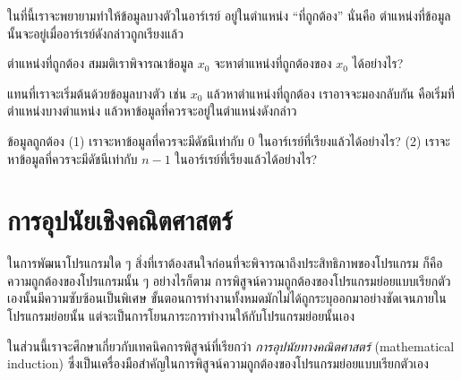 ใน{\wbr}ที่นี้{\wbr}เรา{\wbr}จะ{\wbr}พยายาม{\wbr}ทำ{\wbr}ให้{\wbr}ข้อมูล{\wbr}บาง{\wbr}ตัว{\wbr}ใน{\wbr}อาร์เรย์ อยู่{\wbr}ใน{\wbr}ตำแหน่ง ``ที่{\wbr}ถูกต้อง'' นั่น{\wbr}คือ{\wbr}
ตำแหน่ง{\wbr}ที่{\wbr}ข้อมูล{\wbr}นั้น{\wbr}จะ{\wbr}อยู่{\wbr}เมื่อ{\wbr}อาร์เรย์{\wbr}ดังกล่าว{\wbr}ถูก{\wbr}เรียง{\wbr}แล้ว  

\begin{quiz}{ตำแหน่ง{\wbr}ที่{\wbr}ถูกต้อง}
สมมติ{\wbr}เรา{\wbr}พิจารณา{\wbr}ข้อมูล $x_0$ จะ{\wbr}หา{\wbr}ตำแหน่ง{\wbr}ที่{\wbr}ถูกต้อง{\wbr}ของ $x_0$ ได้{\wbr}อย่างไร?
\end{quiz}

แทน{\wbr}ที่{\wbr}เรา{\wbr}จะ{\wbr}เริ่มต้น{\wbr}ด้วย{\wbr}ข้อมูล{\wbr}บาง{\wbr}ตัว เช่น $x_0$ แล้ว{\wbr}หา{\wbr}ตำแหน่ง{\wbr}ที่{\wbr}ถูกต้อง{\wbr}
เรา{\wbr}อาจ{\wbr}จะ{\wbr}มอง{\wbr}กลับ{\wbr}กัน คือ{\wbr}เริ่ม{\wbr}ที่{\wbr}ตำแหน่ง{\wbr}บาง{\wbr}ตำแหน่ง แล้ว{\wbr}หา{\wbr}ข้อมูล{\wbr}ที่{\wbr}ควร{\wbr}จะ{\wbr}อยู่{\wbr}ใน{\wbr}ตำแหน่ง{\wbr}ดังกล่าว{\wbr}

\begin{quiz}{ข้อมูล{\wbr}ถูกต้อง}
(1) เรา{\wbr}จะ{\wbr}หา{\wbr}ข้อมูล{\wbr}ที่{\wbr}ควร{\wbr}จะ{\wbr}มี{\wbr}ดัชนี{\wbr}เท่า{\wbr}กับ $0$ ใน{\wbr}อาร์เรย์{\wbr}ที่{\wbr}เรียง{\wbr}แล้ว{\wbr}ได้{\wbr}อย่างไร?  (2)
เรา{\wbr}จะ{\wbr}หา{\wbr}ข้อมูล{\wbr}ที่{\wbr}ควร{\wbr}จะ{\wbr}มี{\wbr}ดัชนี{\wbr}เท่า{\wbr}กับ $n-1$ ใน{\wbr}อาร์เรย์{\wbr}ที่{\wbr}เรียง{\wbr}แล้ว{\wbr}ได้{\wbr}อย่างไร?
\end{quiz}

\section{การ{\wbr}อุปนัย{\wbr}เชิง{\wbr}คณิตศาสตร์}

ใน{\wbr}การ{\wbr}พัฒนา{\wbr}โปรแกรม{\wbr}ใด ๆ สิ่ง{\wbr}ที่{\wbr}เรา{\wbr}ต้อง{\wbr}สนใจ{\wbr}ก่อน{\wbr}ที่{\wbr}จะ{\wbr}พิจารณา{\wbr}ถึง{\wbr}ประสิทธิภาพ{\wbr}ของ{\wbr}โปรแกรม{\wbr}
ก็{\wbr}คือ{\wbr}ความ{\wbr}ถูกต้อง{\wbr}ของ{\wbr}โปรแกรม{\wbr}นั้น ๆ อย่างไรก็ตาม{\wbr}
การ{\wbr}พิสูจน์{\wbr}ความ{\wbr}ถูกต้อง{\wbr}ของ{\wbr}โปรแกรมย่อย{\wbr}แบบ{\wbr}เรียก{\wbr}ตัวเอง{\wbr}นั้น{\wbr}มี{\wbr}ความ{\wbr}ซับซ้อน{\wbr}เป็นพิเศษ{\wbr}
ขั้นตอน{\wbr}การ{\wbr}ทำงาน{\wbr}ทั้งหมด{\wbr}มัก{\wbr}ไม่{\wbr}ได้{\wbr}ถูก{\wbr}ระบุ{\wbr}ออก{\wbr}มา{\wbr}อย่าง{\wbr}ชัดเจน{\wbr}ภายใน{\wbr}โปรแกรมย่อย{\wbr}นั้น{\wbr}
แต่{\wbr}จะ{\wbr}เป็น{\wbr}การ{\wbr}โยน{\wbr}ภาระ{\wbr}การ{\wbr}ทำงาน{\wbr}ให้{\wbr}กับ{\wbr}โปรแกรมย่อย{\wbr}นั้น{\wbr}เอง{\wbr}

ใน{\wbr}ส่วน{\wbr}นี้{\wbr}เรา{\wbr}จะ{\wbr}ศึกษา{\wbr}เกี่ยวกับ{\wbr}เทคนิค{\wbr}การ{\wbr}พิสูจน์{\wbr}ที่{\wbr}เรียก{\wbr}ว่า {\em การ{\wbr}อุปนัย{\wbr}ทาง{\wbr}คณิตศาสตร์}
(mathematical induction)
ซึ่ง{\wbr}เป็น{\wbr}เครื่องมือ{\wbr}สำคัญ{\wbr}ใน{\wbr}การ{\wbr}พิสูจน์{\wbr}ความ{\wbr}ถูกต้อง{\wbr}ของ{\wbr}โปรแกรมย่อย{\wbr}แบบ{\wbr}เรียก{\wbr}ตัวเอง{\wbr}


